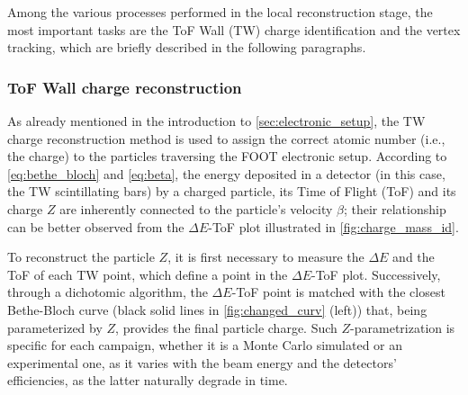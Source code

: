 Among the various processes performed in the local reconstruction stage, the most important tasks are the ToF Wall (TW) charge identification and the vertex tracking, which are briefly described in the following paragraphs.
\subsubsection{ToF Wall charge reconstruction}\label{sssec:tw_charge_reco}
As already mentioned in the introduction to \autoref{sec:electronic_setup}, the TW charge reconstruction method is used to assign the correct atomic number (i.e., the charge) to the particles traversing the FOOT electronic setup. According to \autoref{eq:bethe_bloch} and \autoref{eq:beta}, the energy deposited in a detector (in this case, the TW scintillating bars) by a charged particle, its Time of Flight (ToF) and its charge $Z$ are inherently connected to the particle's velocity $\beta$; their relationship can be better observed from the $\Delta E$-ToF plot illustrated in \autoref{fig:charge_mass_id}.

To reconstruct the particle $Z$, it is first necessary to measure the $\Delta E$ and the ToF of each TW point, which define a point in the $\Delta E$-ToF plot. Successively, through a dichotomic algorithm, the $\Delta E$-ToF point is matched with the closest Bethe-Bloch curve (black solid lines in \autoref{fig:changed_curv} (left)) that, being parameterized by $Z$, provides the final particle charge. Such $Z$-parametrization is specific for each campaign, whether it is a Monte Carlo simulated or an experimental one, as it varies with the beam energy and the detectors' efficiencies, as the latter naturally degrade in time.
